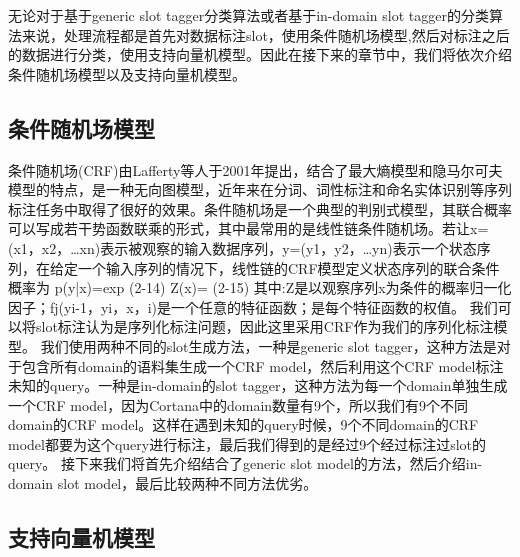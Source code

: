 \documentclass[master]{njuthesis}
\begin{document}
    无论对于基于generic slot tagger分类算法或者基于in-domain slot tagger的分类算法来说，处理流程都是首先对数据标注slot，使用条件随机场模型,然后对标注之后的数据进行分类，使用支持向量机模型。因此在接下来的章节中，我们将依次介绍条件随机场模型以及支持向量机模型。

\subsection{条件随机场模型}

条件随机场(CRF)由Lafferty等人于2001年提出，结合了最大熵模型和隐马尔可夫模型的特点，是一种无向图模型，近年来在分词、词性标注和命名实体识别等序列标注任务中取得了很好的效果。条件随机场是一个典型的判别式模型，其联合概率可以写成若干势函数联乘的形式，其中最常用的是线性链条件随机场。若让x=(x1，x2，…xn)表示被观察的输入数据序列，y=(y1，y2，…yn)表示一个状态序列，在给定一个输入序列的情况下，线性链的CRF模型定义状态序列的联合条件概率为
p(y|x)=exp{} (2-14)
Z(x)={} (2-15)
其中:Z是以观察序列x为条件的概率归一化因子；fj(yi-1，yi，x，i)是一个任意的特征函数；是每个特征函数的权值。
我们可以将slot标注认为是序列化标注问题，因此这里采用CRF作为我们的序列化标注模型。
我们使用两种不同的slot生成方法，一种是generic slot tagger，这种方法是对于包含所有domain的语料集生成一个CRF model，然后利用这个CRF model标注未知的query。一种是in-domain的slot tagger，这种方法为每一个domain单独生成一个CRF model，因为Cortana中的domain数量有9个，所以我们有9个不同domain的CRF model。这样在遇到未知的query时候，9个不同domain的CRF model都要为这个query进行标注，最后我们得到的是经过9个经过标注过slot的query。
接下来我们将首先介绍结合了generic slot model的方法，然后介绍in-domain slot model，最后比较两种不同方法优劣。
\subsection{支持向量机模型}
\end{document}
